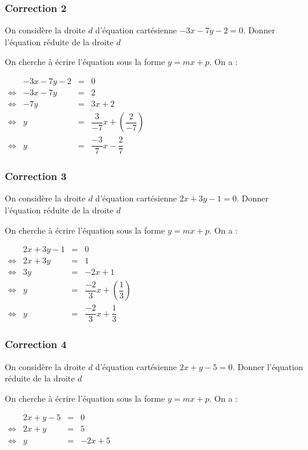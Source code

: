 \documentclass[15pt, mathserif]{beamer}
\begin{document}
\begin{frame}
\vspace{-10mm}
	\frametitle{Correction 2}
On considère la droite $d$ d'équation cartésienne $-3x-7y-2=0$. Donner l'équation réduite de la droite $d$ 
 
  \bigskip 
 
 On cherche à écrire l'équation sous la forme $y=mx+p$. On a : 
 
 \hfil $\begin{array}{crcl} 
 & -3x-7y-2&=&0 \\ 
 \Leftrightarrow & -3x-7y & =&2\\ 
 \Leftrightarrow & -7y &=&3x+2\\ 
 \Leftrightarrow & y &=& \dfrac{3}{-7}x +\left( \dfrac{2}{-7} \right)\\ 
 \Leftrightarrow & y &=&\dfrac{-3}{7}x -\dfrac{2}{7}\end{array}$ 
 
 \end{frame}


\begin{frame}
\vspace{-10mm}
	\frametitle{Correction 3}
On considère la droite $d$ d'équation cartésienne $2x+3y-1=0$. Donner l'équation réduite de la droite $d$ 
 
  \bigskip 
 
 On cherche à écrire l'équation sous la forme $y=mx+p$. On a : 
 
 \hfil $\begin{array}{crcl} 
 & 2x+3y-1&=&0 \\ 
 \Leftrightarrow & 2x+3y & =&1\\ 
 \Leftrightarrow & 3y &=&-2x+1\\ 
 \Leftrightarrow & y &=& \dfrac{-2}{3}x +\left( \dfrac{1}{3} \right)\\ 
 \Leftrightarrow & y &=&\dfrac{-2}{3}x +\dfrac{1}{3}\end{array}$ 
 
 \end{frame}


\begin{frame}
\vspace{-10mm}
	\frametitle{Correction 4}
On considère la droite $d$ d'équation cartésienne $2x+y-5=0$. Donner l'équation réduite de la droite $d$ 
 
  \bigskip 
 
 On cherche à écrire l'équation sous la forme $y=mx+p$. On a : 
 
 \hfil $\begin{array}{crcl} 
 & 2x+y-5&=&0 \\ 
 \Leftrightarrow & 2x+y & =&5\\ 
 \Leftrightarrow & y &=&-2x+5\end{array}$ 
 
 \end{frame}
\end{document}
